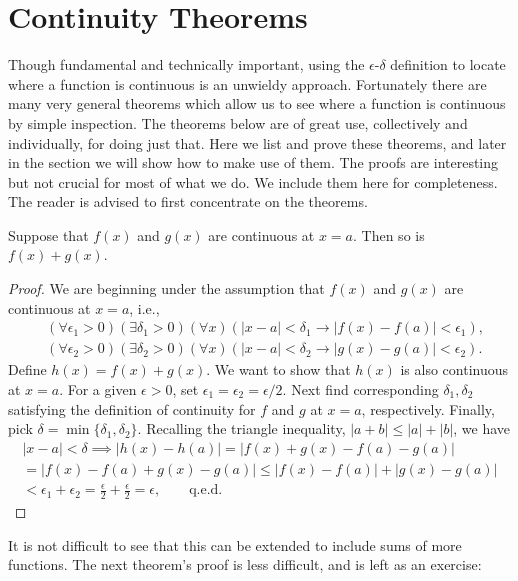 







\newpage
\section[Continuity Theorems]%
{Continuity Theorems\label{ContinuityTheoremsSection}}
Though fundamental and technically important, using 
the $\epsilon$-$\delta$ definition to 
locate where a function is continuous is an unwieldy
approach.  Fortunately there are many very general theorems
which allow us to see  where a function is continuous
by simple inspection.  The theorems below are of
great use, collectively and individually,  for doing just that.
Here we list and prove these theorems, and later in
the section we will show how to make use of them.
The proofs are interesting but not crucial for most of
what we do.  We include them here for completeness.
The reader is advised to first concentrate on the theorems.


\begin{theorem}Suppose that $f(x)$ and $g(x)$
are continuous at $x=a$.  Then so is 
$f(x)+g(x)$.
\end{theorem}

\begin{proof}

We are beginning under the assumption that
$f(x)$ and $g(x)$ are continuous at $x=a$, i.e., 
\begin{align*}
&(\forall \epsilon_1>0)(\exists \delta_1>0)(\forall x)(|x-a|<\delta_1
  \longrightarrow|f(x)-f(a)|<\epsilon_1),\\
&(\forall \epsilon_2>0)(\exists \delta_2>0)(\forall x)(|x-a|<\delta_2
  \longrightarrow|g(x)-g(a)|<\epsilon_2).\end{align*}
Define $h(x)=f(x)+g(x)$. 
We want to show that
$h(x)$ is also continuous at $x=a$.
For a given $\epsilon>0$, set $\epsilon_1=\epsilon_2=
{\epsilon}/2$.  Next find corresponding $\delta_1,
\delta_2$ satisfying the definition of continuity
for $f$ and $g$ at $x=a$, respectively.
Finally,  pick $\delta=\min\{\delta_1,\delta_2\}.$
Recalling the triangle inequality, $|a+b|\le|a|+|b|$, we have
\begin{multline*}
|x-a|<\delta\implies
|h(x)-h(a)|=|f(x)+g(x)-f(a)-g(a)|\\
=|f(x)-f(a)+g(x)-g(a)|\le|f(x)-f(a)|+|g(x)-g(a)|\\
<\epsilon_1+\epsilon_2=\frac{\epsilon}2+\frac{\epsilon}2=\epsilon,
\qquad\text{q.e.d.}\end{multline*}
\end{proof}
It is not difficult to see that this can be extended
to include sums of more functions.  The next theorem's
proof is less difficult, and is left as an exercise:

